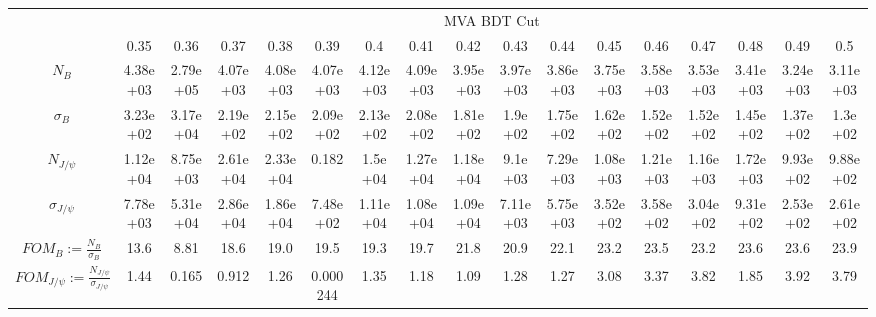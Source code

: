 \begin{table}[!h]
\centering
\begin{adjustbox}{width=18cm, rotate=90}
\begin{tabular}{*{1}{c|}*{16}{c}}
& \multicolumn{16}{c}{MVA BDT Cut}\\
& 0.35& 0.36& 0.37& 0.38& 0.39& 0.4& 0.41& 0.42& 0.43& 0.44& 0.45& 0.46& 0.47& 0.48& 0.49& 0.5\\ \hline
$N_B$& 4.38e+03& 2.79e+05& 4.07e+03& 4.08e+03& 4.07e+03& 4.12e+03& 4.09e+03& 3.95e+03& 3.97e+03& 3.86e+03& 3.75e+03& 3.58e+03& 3.53e+03& 3.41e+03& 3.24e+03& 3.11e+03\\
$\sigma_B$& 3.23e+02& 3.17e+04& 2.19e+02& 2.15e+02& 2.09e+02& 2.13e+02& 2.08e+02& 1.81e+02& 1.9e+02& 1.75e+02& 1.62e+02& 1.52e+02& 1.52e+02& 1.45e+02& 1.37e+02& 1.3e+02\\
$N_{J/\psi}$& 1.12e+04& 8.75e+03& 2.61e+04& 2.33e+04& 0.182& 1.5e+04& 1.27e+04& 1.18e+04& 9.1e+03& 7.29e+03& 1.08e+03& 1.21e+03& 1.16e+03& 1.72e+03& 9.93e+02& 9.88e+02\\
$\sigma_{J/\psi}$& 7.78e+03& 5.31e+04& 2.86e+04& 1.86e+04& 7.48e+02& 1.11e+04& 1.08e+04& 1.09e+04& 7.11e+03& 5.75e+03& 3.52e+02& 3.58e+02& 3.04e+02& 9.31e+02& 2.53e+02& 2.61e+02\\ \hline
$FOM_{B}:=\frac{N_B}{\sigma_B}$& 13.6& 8.81& 18.6& 19.0& 19.5& 19.3& 19.7& 21.8& 20.9& 22.1& 23.2& 23.5& 23.2& 23.6& 23.6& 23.9\\
$FOM_{J/\psi}:=\frac{N_{J/\psi}}{\sigma_{J/\psi}}$& 1.44& 0.165& 0.912& 1.26& 0.000244& 1.35& 1.18& 1.09& 1.28& 1.27& 3.08& 3.37& 3.82& 1.85& 3.92& 3.79\\ \hline
\end{tabular}
\end{adjustbox}
\end{table}
